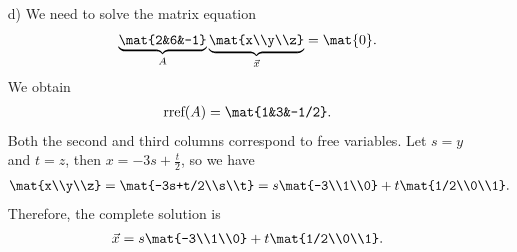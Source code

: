\begin{exercises}
\begin{problist}
\begin{solution}
\begin{enumerate}
		
				\item[d)] We need to solve the matrix equation
				\begin{align*}
					\underbrace{\mat{2&6&-1} }_{A} \underbrace{\mat{x\\y\\z}}_{\vec{x}} = \mat{0}.
				\end{align*}
			We obtain
				\begin{align}
					\textrm{rref}(A) = \mat{1&3&-1/2}.
				\end{align}
			Both the second and third columns correspond to free variables. Let $s=y$ and $t=z$, then $x = -3s + \frac{t}{2}$, so we have
				\begin{align*}
					\mat{x\\y\\z} = \mat{-3s+t/2\\s\\t} = s\mat{-3\\1\\0} + t\mat{1/2\\0\\1}.
				\end{align*}
			Therefore, the complete solution is
				\begin{align*}
					\vec{x} = s\mat{-3\\1\\0} + t\mat{1/2\\0\\1}.
				\end{align*}
			\end{enumerate}
		\end{solution}	


\end{problist}
\end{exercises}
